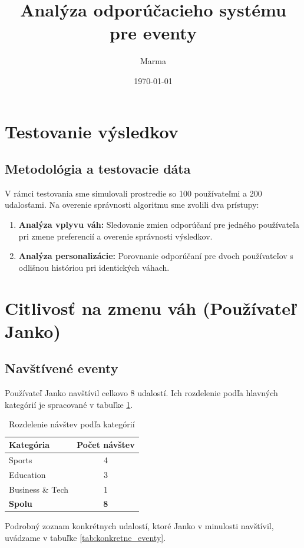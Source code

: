 \documentclass[12pt,a4paper]{article}
\title{Analýza odporúčacieho systému pre eventy}
\author{Marma}
\date{\today}
\begin{document}
\section{Testovanie výsledkov}

\subsection{Metodológia a testovacie dáta}
V rámci testovania sme simulovali prostredie so 100 používateľmi a 200 udalosťami. Na overenie správnosti algoritmu sme zvolili dva prístupy:
\begin{enumerate}
    \item \textbf{Analýza vplyvu váh:} Sledovanie zmien odporúčaní pre jedného používateľa pri zmene preferencií a overenie správnosti výsledkov.
    \item \textbf{Analýza personalizácie:} Porovnanie odporúčaní pre dvoch používateľov s odlišnou históriou pri identických váhach.
\end{enumerate}


\section{Citlivosť na zmenu váh (Používateľ Janko)}
\subsection{Navštívené eventy}

Používateľ Janko navštívil celkovo 8 udalostí. Ich rozdelenie podľa hlavných kategórií je spracované v tabuľke \ref{tab:rozdelenie_kat}.

\begin{table}[H]
\centering
\caption{Rozdelenie návštev podľa kategórií}
\label{tab:rozdelenie_kat}
\begin{tabular}{|l|c|}
\hline
\textbf{Kategória} & \textbf{Počet návštev} \\ \hline
Sports & 4 \\
Education & 3 \\
Business \& Tech & 1 \\ \hline
\textbf{Spolu} & \textbf{8} \\ \hline
\end{tabular}
\end{table}

Podrobný zoznam konkrétnych udalostí, ktoré Janko v minulosti navštívil, uvádzame v tabuľke \ref{tab:konkretne_eventy}.
\end{document}
